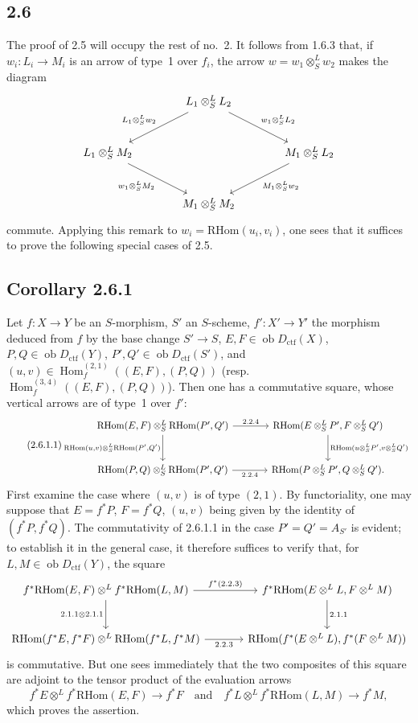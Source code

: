 \documentclass[11pt]{article}
\DeclareMathOperator{\Hom}{Hom}
\newcommand{\ob}{\operatorname{ob}}
\providecommand{\RHom}{\mathrm{RHom}}
\providecommand{\ctf}{\mathrm{ctf}}
\providecommand{\RHom}{\mathrm{RHom}}
\providecommand{\Hom}{\operatorname{Hom}}
\providecommand{\ob}{\operatorname{ob}}
\providecommand{\RHom}{\mathrm R\mathcal{H}om}
\providecommand{\RHom}{\mathrm{RHom}}
\begin{document}
\subsection*{2.6}
The proof of 2.5 will occupy the rest of no.~2. It follows from 1.6.3 that, if $w_i:L_i\to M_i$ is an arrow of type~1 over $f_i$, the arrow $w=w_1\otimes^{L}_{S}w_2$ makes the diagram
\[
\begin{tikzcd}[column sep=large,row sep=large]
& L_1\otimes^L_S L_2 \arrow[dl,"{L_1\otimes^L_S w_2}"'] \arrow[dr,"{w_1\otimes^L_S L_2}"] & \\
L_1\otimes^L_S M_2 \arrow[dr,"{w_1\otimes^L_S M_2}"'] & & M_1\otimes^L_S L_2 \arrow[dl,"{M_1\otimes^L_S w_2}"]\\
& M_1\otimes^L_S M_2 &
\end{tikzcd}
\]
commute. Applying this remark to $w_i=\RHom(u_i,v_i)$, one sees that it suffices to prove the following special cases of 2.5.

\subsection*{Corollary 2.6.1}
Let $f:X\to Y$ be an $S$-morphism, $S'$ an $S$-scheme, $f':X'\to Y'$ the morphism deduced from $f$ by the base change $S'\to S$, $E,F\in\ob D_{\ctf}(X)$, $P,Q\in\ob D_{\ctf}(Y)$, $P',Q'\in\ob D_{\ctf}(S')$, and $(u,v)\in\Hom_f^{(2,1)}((E,F),(P,Q))$ (resp. $\Hom_f^{(3,4)}((E,F),(P,Q))$). Then one has a commutative square, whose vertical arrows are of type~1 over $f'$:
\begin{equation}\tag{2.6.1.1}
\begin{tikzcd}[column sep=large,row sep=large]
\RHom(E,F)\otimes^L_S\RHom(P',Q') \arrow[r,"2.2.4"] \arrow[d,"{\RHom(u,v)\otimes^L_S\RHom(P',Q')}"'] & \RHom(E\otimes^L_SP',F\otimes^L_SQ') \arrow[d,"{\RHom(u\otimes^L_SP',v\otimes^L_SQ')}"]\\
\RHom(P,Q)\otimes^L_S\RHom(P',Q') \arrow[r,"2.2.4"'] & \RHom(P\otimes^L_SP',Q\otimes^L_SQ').
\end{tikzcd}
\end{equation}
First examine the case where $(u,v)$ is of type $(2,1)$. By functoriality, one may suppose that $E=f^{*}P$, $F=f^{*}Q$, $(u,v)$ being given by the identity of $(f^{*}P,f^{*}Q)$. The commutativity of 2.6.1.1 in the case $P'=Q'=A_{S'}$ is evident; to establish it in the general case, it therefore suffices to verify that, for $L,M\in\ob D_{\ctf}(Y)$, the square
\[
\begin{tikzcd}[column sep=large,row sep=large]
f^{*}\RHom(E,F)\otimes^L f^{*}\RHom(L,M) \arrow[r,"{f^*(2.2.3)}"] \arrow[d,"{2.1.1\otimes 2.1.1}"'] & f^{*}\RHom(E\otimes^LL,F\otimes^LM) \arrow[d,"2.1.1"]\\
\RHom(f^{*}E,f^{*}F)\otimes^L\RHom(f^{*}L,f^{*}M) \arrow[r,"2.2.3"'] & \RHom(f^{*}(E\otimes^LL),f^{*}(F\otimes^LM))
\end{tikzcd}
\]
is commutative. But one sees immediately that the two composites of this square are adjoint to the tensor product of the evaluation arrows
\[
f^{*}E\otimes^L f^{*}\RHom(E,F)\longrightarrow f^{*}F
\quad\text{and}\quad
f^{*}L\otimes^L f^{*}\RHom(L,M)\longrightarrow f^{*}M,
\]
which proves the assertion.
\end{document}
